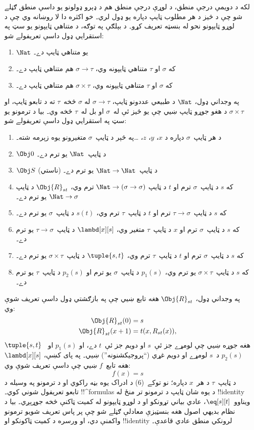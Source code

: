 \documentclass[../../../include/open-logic-section]{subfiles}
\begin{document}
لکه د دويمې درجې منطق، د لوړې درجې منطق هم د ډېرو ډولونو يو داسې
منطق ګڼلے شو چې د څيز د هر مطلوب ټايپ دپاره يو ډول لري۔ خو اکثره دا
لا روښانه وي چې د لوړو ټايپونو نحو له بنسټه تعريف کړو۔ د بېلګې په
توګه، د متناهي ټايپونو يو سټ په استقرايي ډول داسې تعريفولے شو:
\begin{enumerate}
\item $\Nat$ يو متناهي ټايپ دے۔
\item که $\sigma$ او $\tau$ متناهي ټايپونه وي، $\sigma
  \to \tau$ هم متناهي ټايپ دے۔
\item که $\sigma$ او $\tau$ متناهي ټايپونه وي، $\sigma \times
  \tau$ هم متناهي ټايپ دے۔
\end{enumerate}
په وجداني ډول، $\Nat$ د طبيعي عددونو ټايپ، $\sigma \to \tau$ له
$\sigma$ څخه~$\tau$ ته د تابعو ټايپ، او $\sigma \times \tau$ د هغو
جوړو ټايپ ښيي چې يو څيز ئې له~$\sigma$ او بل له~$\tau$ څخه وي۔ بيا د
ترمونو يو سټ په استقرايي ډول داسې تعريفولے شو:
\begin{enumerate}
\item د هر ټايپ~$\sigma$ دپاره د $x$، $y$، $z$، \dots په څېر د
  ټايپ~$\sigma$ متغيرونو يوه زېرمه شته۔
\item $\Obj 0$ د ټايپ~$\Nat$ يو ترم دے۔
\item $\Obj S$ (ناستي) د ټايپ~$\Nat \to \Nat$ يو ترم دے۔
\item که $s$ د ټايپ~$\sigma$ ترم او $t$ د ټايپ
  $\Nat \to (\sigma \to \sigma)$ ترم وي، $\Obj{R}_{st}$ د ټايپ
  $\Nat \to \sigma$ يو ترم دے۔
\item که $s$ د ټايپ~$\tau \to \sigma$ ترم او $t$ د ټايپ~$\tau$
  ترم وي، $s(t)$ د ټايپ~$\sigma$ يو ترم دے۔
\item که $s$ د ټايپ~$\sigma$ ترم او $x$ د ټايپ~$\tau$ متغير وي،
  $\lambd[x][s]$ د ټايپ~$\tau \to \sigma$ يو ترم دے۔
\item که $s$ د ټايپ~$\sigma$ ترم او $t$ د ټايپ~$\tau$ ترم وي،
  $\tuple{s, t}$ د ټايپ~$\sigma \times \tau$ يو ترم دے۔
\item که $s$ د ټايپ~$\sigma \times \tau$ يو ترم وي، $p_1(s)$ د
  ټايپ~$\sigma$ يو ترم او $p_2(s)$ د ټايپ~$\tau$ يو ترم دے۔
\end{enumerate}
په وجداني ډول، $\Obj{R}_{st}$ هغه تابع ښيي چې په بازګشتي ډول داسې
تعريف شوې وي:
\begin{align*}
\Obj{R}_{st}(0) & = s \\
\Obj{R}_{st}(x+1) & = t(x, R_{st}(x)),
\end{align*}
$\tuple{s, t}$ هغه جوړه ښيي چې لومړے جز ئې~$s$ او دويم جز ئې~$t$
دے، او $p_1(s)$ او~$p_2(s)$ د~$s$ لومړے او دويم غړي
(``پروجيکشنونه'') ښيي۔ په پاى کښې، $\lambd[x][s]$ هغه تابع~$f$ ښيي
چې داسې تعريف شوې وي:
\[
f(x) = s
\]
د ټايپ~$\tau$ د هر~$x$ دپاره؛ نو توکے~(6) د ادراک يوه بڼه راکوي او
د ترمونو په وسيله د تابعو تعريفول شوني کوي۔ !!^{formula}s د يوه شان
ټايپ د ترمونو تر منځ له !!{identity} ويناوو~$\eq[s][t]$، عادي بياني
تړونکو او د لوړو ټايپونو له کميت ټاکنې څخه جوړېږي۔ بيا د نظام بديهي
اصول هغه بنسټيزې معادلې ګڼلے شو چې پر پاس تعريف شويو ترمونو واکمنې
دي، او ورسره د کميت ټاکونکو او !!{identity} لرونکي منطق عادي قاعدې۔
\end{document}
